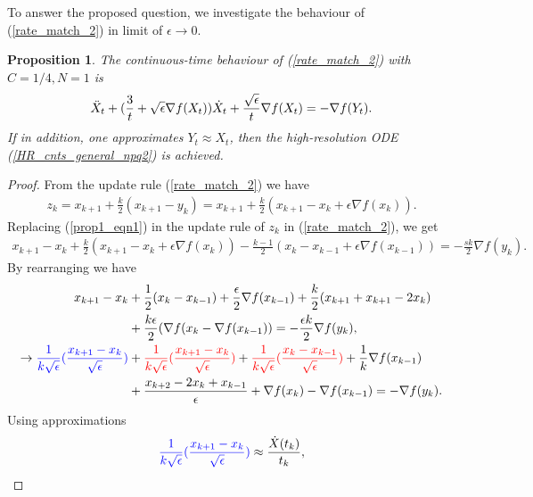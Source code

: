 \documentclass{article}
\theoremstyle{plain}
\newtheorem{prop}{\textbf{Proposition}}
\theoremstyle{definition}
\theoremstyle{remark}
\begin{document}
To answer the proposed question, we investigate the behaviour of (\ref{rate_match_2}) in limit of $\epsilon \rightarrow 0$.
\begin{prop}
The continuous-time behaviour of (\ref{rate_match_2}) with $C=1/4,N=1$ is
\begin{align}\label{cont_rate_match_2}
    \Ddot{X}_t+(\frac{3}{t}+\sqrt{\epsilon}\nabla f(X_t))\dot X_t+\frac{\sqrt{\epsilon}}{t}\nabla f(X_t)=-\nabla f(Y_t).
\end{align}
If in addition, one approximates $Y_t\approx X_t$, then the high-resolution ODE (\ref{HR_cnts_general_npq2}) is achieved.
\end{prop}
\begin{proof}
    From the update rule (\ref{rate_match_2}) we have
    \begin{align}\label{prop1_eqn1}
        z_k = x_{k+1}+\frac{k}{2}(x_{k+1}-y_k)=x_{k+1}+\frac{k}{2}(x_{k+1}-x_k+\epsilon \nabla f(x_k)).
    \end{align}
    Replacing (\ref{prop1_eqn1}) in the update rule of $z_k$ in (\ref{rate_match_2}), we get
    \begin{align}\label{prop1_eqn2}
        x_{k+1}-x_k+\frac{k}{2}(x_{k+1}-x_k+\epsilon\nabla f(x_k))-\frac{k-1}{2}(x_k-x_{k-1}+\epsilon \nabla f(x_{k-1}))=-\frac{sk}{2}\nabla f(y_k).
    \end{align}
    By rearranging we have
      \begin{align}\label{prop1_eqn3}
        x_{k+1}-x_k&+\frac{1}{2}(x_{k}-x_{k-1})+\frac{\epsilon}{2}\nabla f(x_{k-1})+\frac{k}{2}(x_{k+1}+x_{k+1}-2x_k)\nonumber\\
        &+\frac{k\epsilon}{2}(\nabla f(x_{k}- \nabla f(x_{k-1}))=-\frac{\epsilon k}{2}\nabla f(y_k),\nonumber\\
        \rightarrow \color{blue}\frac{1}{k\sqrt{\epsilon}}(\frac{x_{k+1}-x_k}{\sqrt{\epsilon}})\color{black}&+\color{red}\frac{1}{k\sqrt{\epsilon}}(\frac{x_{k+1}-x_k}{\sqrt{\epsilon}})\color{black}+\color{red}\frac{1}{k\sqrt{\epsilon}}(\frac{x_k-x_{k-1}}{\sqrt{\epsilon}})\color{black} +\frac{1}{k}\nabla f(x_{k-1}) \nonumber\\
        & +\frac{x_{k+2}-2x_k+x_{k-1}}{\epsilon}+\nabla f(x_k)-\nabla f(x_{k-1})=-\nabla f(y_k).
    \end{align}
    Using approximations
    \begin{align}\label{prop1_eqn4}
        \color{blue}\frac{1}{k\sqrt{\epsilon}}(\frac{x_{k+1}-x_k}{\sqrt{\epsilon}})&\approx \frac{\dot X(t_k)}{t_k},\\

\end{align}
\end{proof}
\end{document}
